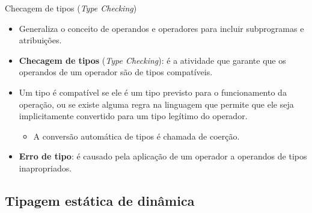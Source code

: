 \documentclass[handout]{beamer}
\begin{document}
\begin{frame}{Checagem de tipos (\textit{Type Checking})}

\begin{itemize}
\item Generaliza o conceito de operandos e operadores para incluir subprogramas e atribuições.

\item \textbf{Checagem de tipos} (\textit{Type Checking}): é a atividade que garante que os operandos de um operador são de tipos compatíveis.

\item Um tipo é compatível se ele é um tipo previsto para o funcionamento da operação, ou se existe alguma regra na linguagem que permite que ele seja implicitamente convertido para um tipo legítimo do operador.
    \begin{itemize}
    \item A conversão automática de tipos é chamada de coerção.
    \end{itemize}

\item \textbf{Erro de tipo}: é causado pela aplicação de um operador a operandos de tipos inapropriados.
\end{itemize}
\end{frame}

\subsection{Tipagem estática de dinâmica}
\end{document}
